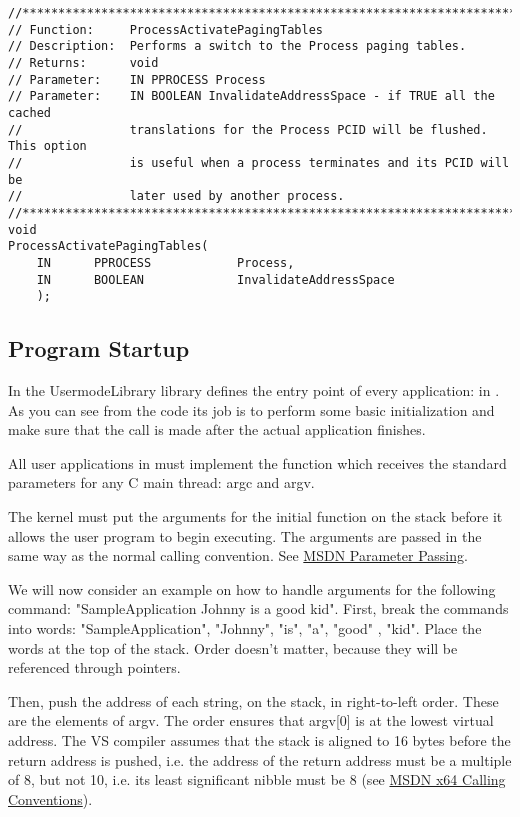 \begin{appendices}
\begin{lstlisting}[caption={Process Private Interface},label={lst:ProcPrivate}]
//******************************************************************************
// Function:     ProcessActivatePagingTables
// Description:  Performs a switch to the Process paging tables.
// Returns:      void
// Parameter:    IN PPROCESS Process
// Parameter:    IN BOOLEAN InvalidateAddressSpace - if TRUE all the cached
//               translations for the Process PCID will be flushed. This option
//               is useful when a process terminates and its PCID will be
//               later used by another process.
//******************************************************************************
void
ProcessActivatePagingTables(
    IN      PPROCESS            Process,
    IN      BOOLEAN             InvalidateAddressSpace
    );
\end{lstlisting}

\subsection{Program Startup}
\label{sect:ProgramStart}

In \projectname the UsermodeLibrary library defines the entry point of every application:
 in . As you can see from the code its job is to perform some basic
initialization and make sure that the  call is made after the actual
application finishes.

All user applications in \projectname must implement the  function which receives the
standard parameters for any C main thread: argc and argv.

The kernel must put the arguments for the initial function on the stack before it allows the user
program to begin executing. The arguments are passed in the same way as the normal calling
convention. See \href{https://msdn.microsoft.com/en-us/library/zthk2dkh.aspx}{MSDN Parameter Passing}.

We will now consider an example on how to handle arguments for the following command:
"SampleApplication Johnny is a good kid". First, break the commands into words: "SampleApplication",
"Johnny", "is", "a", "good" , "kid". Place the words at the top of the stack. Order doesn't matter,
because they will be referenced through pointers.

Then, push the address of each string, on the stack, in right-to-left order. These are the elements
of argv. The order ensures that argv[0] is at the lowest virtual address. The VS compiler assumes
that the stack is aligned to 16 bytes before the return address is pushed, i.e. the address of the
return address must be a multiple of 8, but not 10, i.e. its least significant nibble must be 8
(see \href{https://msdn.microsoft.com/en-us/library/ms235286.aspx}{MSDN x64 Calling Conventions}).


\end{appendices}
